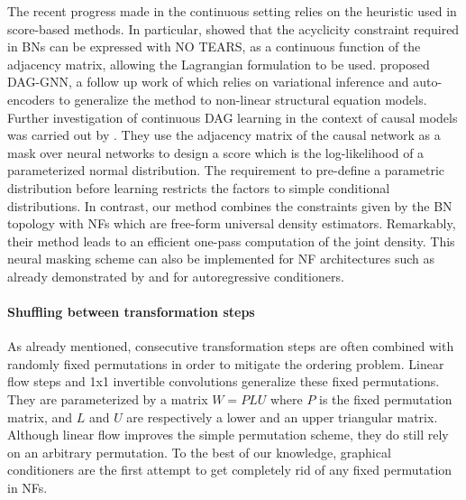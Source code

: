 \documentclass[twoside]{article}
\begin{document}
The recent progress made in the continuous setting relies on the heuristic used in score-based methods. In particular, \citet{DAG-1} showed that the acyclicity constraint required in BNs can be expressed with NO TEARS, as a continuous function of the adjacency matrix, allowing the Lagrangian formulation to be used.
\citet{DAG-2} proposed DAG-GNN, a follow up work of \citet{DAG-1} which relies on variational inference and auto-encoders to generalize the method to non-linear structural equation models. Further investigation of continuous DAG learning in the context of causal models was carried out by \citet{DAG-3}. They use the adjacency matrix of the causal network as a mask over neural networks to design a score which is the log-likelihood of a parameterized normal distribution. The requirement to pre-define a parametric distribution before learning restricts the factors to simple conditional distributions. In contrast, our method combines the constraints given by the BN topology with  NFs which are free-form universal density estimators. Remarkably, their method leads to an efficient one-pass computation of the joint density. This neural masking scheme can also be implemented for NF architectures such as already demonstrated by \citet{MAF} and \citet{BNAF} for autoregressive conditioners.

\paragraph{Shuffling between transformation steps}
As already mentioned, consecutive transformation steps are often combined with randomly fixed permutations in order to mitigate the ordering problem. Linear flow steps \citep{TAN} and 1x1 invertible convolutions \citep{GLOW} generalize these fixed permutations. They are parameterized by a matrix $W = PLU$ where $P$ is the fixed permutation matrix, and $L$ and $U$ are respectively a lower and an upper triangular matrix. Although linear flow improves the simple permutation scheme, they do still rely on an arbitrary permutation. To the best of our knowledge, graphical conditioners are the first attempt to get completely rid of any fixed permutation in NFs.


\end{document}

